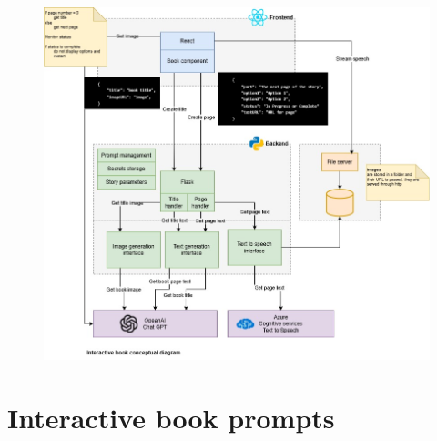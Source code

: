 \documentclass[conference]{IEEEtran}
\begin{document}
	\begin{figure}[H]
		\centering
		\includegraphics[width=0.9\linewidth]{"img/img-ARI3333-project-conceptual-diagram (1)"}
		\caption{}
		\label{fig:img-ari3333-project-conceptual-diagram-1}
	\end{figure}

\pagebreak
\section{Interactive book prompts}
\end{document}
